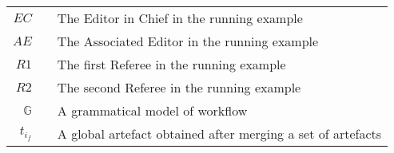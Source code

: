 \begin{center}
	\begin{tabular}[t]{rp{5mm}p{12cm}}
		$EC$ & &  The Editor in Chief in the running example \\
		$AE$ & &  The Associated Editor in the running example \\
		$R1$ & &  The first Referee in the running example \\
		$R2$ & &  The second Referee in the running example \\
		$\mathbb{G}$ & &  A grammatical model of workflow \\
		$t_{i_f}$ & & A global artefact obtained after merging a set of artefacts
	\end{tabular}
\end{center}

